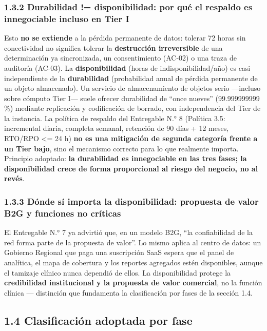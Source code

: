 \documentclass[11pt,a4paper]{article}
\begin{document}
\subsubsection{1.3.2 Durabilidad != disponibilidad: por qué el respaldo es innegociable incluso en Tier I}\label{durabilidad-disponibilidad-por-quuxe9-el-respaldo-es-innegociable-incluso-en-tier-i}

Esto \textbf{no se extiende} a la pérdida permanente de datos: tolerar 72 horas sin conectividad no significa tolerar la \textbf{destrucción irreversible} de una determinación ya sincronizada, un consentimiento (AC-02) o una traza de auditoría (AC-03). La \textbf{disponibilidad} (horas de indisponibilidad/año) es casi independiente de la \textbf{durabilidad} (probabilidad anual de pérdida permanente de un objeto almacenado). Un servicio de almacenamiento de objetos serio ---incluso sobre cómputo Tier I--- suele ofrecer durabilidad de ``once nueves'' (99.999999999 \%) mediante replicación y codificación de borrado, con independencia del Tier de la instancia. La política de respaldo del Entregable N.° 8 (Política 3.5: incremental diaria, completa semanal, retención de 90 días + 12 meses, RTO/RPO \textless= 24 h) \textbf{no es una mitigación de segunda categoría frente a un Tier bajo}, sino el mecanismo correcto para lo que realmente importa. Principio adoptado: \textbf{la durabilidad es innegociable en las tres fases; la disponibilidad crece de forma proporcional al riesgo del negocio, no al revés}.

\subsubsection{1.3.3 Dónde sí importa la disponibilidad: propuesta de valor B2G y funciones no críticas}\label{duxf3nde-suxed-importa-la-disponibilidad-propuesta-de-valor-b2g-y-funciones-no-cruxedticas}

El Entregable N.° 7 ya advirtió que, en un modelo B2G, ``la confiabilidad de la red forma parte de la propuesta de valor''. Lo mismo aplica al centro de datos: un Gobierno Regional que paga una suscripción SaaS espera que el panel de analítica, el mapa de cobertura y los reportes agregados estén disponibles, aunque el tamizaje clínico nunca dependió de ellos. La disponibilidad protege la \textbf{credibilidad institucional y la propuesta de valor comercial}, no la función clínica --- distinción que fundamenta la clasificación por fases de la sección 1.4.

\subsection{1.4 Clasificación adoptada por fase}\label{clasificaciuxf3n-adoptada-por-fase}
\end{document}
